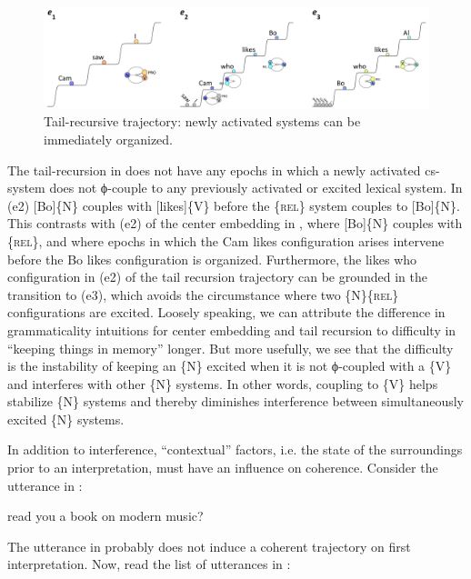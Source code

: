   
\begin{figure}
\includegraphics[width=\textwidth]{figures/Tilsen-img133.png}
\caption{Tail-recursive trajectory: newly activated systems can be immediately organized.}
\label{fig:6:14}
\end{figure}
 

  The tail-recursion in {} does not have any epochs in which a newly activated cs-system does not ϕ-couple to any previously activated or excited lexical system. In (e2) [Bo]\{N\} couples with [likes]\{V\} before the \{\textsc{rel}\} system couples to [Bo]\{N\}. This contrasts with (e2) of the center embedding in {}, where [Bo]\{N\} couples with \{\textsc{rel}\}, and where epochs in which the {\textbar}Cam likes{\textbar} configuration arises intervene before the {\textbar}Bo likes{\textbar} configuration is organized. Furthermore, the {\textbar}likes who{\textbar} configuration in (e2) of the tail recursion trajectory can be grounded in the transition to (e3), which avoids the circumstance where two \{N\}\{\textsc{rel}\} configurations are excited. Loosely speaking, we can attribute the difference in grammaticality intuitions for center embedding and tail recursion to difficulty in “keeping things in memory” longer. But more usefully, we see that the difficulty is the instability of keeping an \{N\} excited when it is not ϕ-coupled with a \{V\} and interferes with other \{N\} systems. In other words, coupling to \{V\} helps stabilize \{N\} systems and thereby diminishes interference between simultaneously excited \{N\} systems.

  In addition to interference, “contextual” factors, i.e. the state of the surroundings prior to an interpretation, must have an influence on coherence. Consider the utterance in :

  \ea\label{ex:6:19}
    {read you a book on modern music?}
\z

The utterance in  probably does not induce a coherent trajectory on first interpretation. Now, read the list of utterances in :

\ea\label{ex:6:20}
\z
\z


